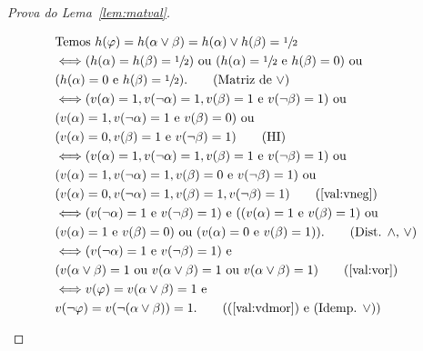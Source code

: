 \begin{proof}[Prova do Lema~\ref{lem:matval}]
\begin{provaporcasos}
\begin{provaporsubcasos}
                    \begin{align*}
                        &\textnormal{Temos }h(\phi) = h(\alpha \lor \beta) = h(\alpha) \lor h(\beta) = \meio{}\\
                        &\Longleftrightarrow (h(\alpha) = h(\beta) = \meio{})\textnormal{ ou } (h(\alpha) = \meio{}\textnormal{ e }h(\beta) = 0)\textnormal{ ou }\\&(h(\alpha) = 0\textnormal{ e }h(\beta) = \meio{}).\tag*{(Matriz de $\lor$)}\\
                        &\Longleftrightarrow (v(\alpha) = 1, v(\neg \alpha) = 1, v(\beta) = 1\textnormal{ e }v(\neg \beta) = 1)\text{ ou }\\&(v(\alpha) = 1, v(\neg \alpha) = 1\textnormal{ e }v(\beta) = 0)\text{ ou }\\&(v(\alpha) = 0, v(\beta) = 1\textnormal{ e }v(\neg \beta) = 1)\tag*{(HI)}\\
                        &\Longleftrightarrow (v(\alpha) = 1, v(\neg \alpha) = 1, v(\beta) = 1\textnormal{ e }v(\neg \beta) = 1)\textnormal{ ou }\\&(v(\alpha) = 1, v(\neg \alpha) = 1, v(\beta) = 0\textnormal{ e }v(\neg \beta) = 1)\textnormal{ ou }\\&(v(\alpha) = 0, v(\neg \alpha) = 1, v(\beta) = 1, v(\neg \beta) = 1)\tag*{(\ref{val:vneg})}\\
                        &\Longleftrightarrow (v(\neg \alpha) = 1\textnormal{ e }v(\neg \beta) = 1)\textnormal{ e }((v(\alpha) = 1\textnormal{ e }v(\beta) = 1)\text{ ou }\\&(v(\alpha) = 1\textnormal{ e }v(\beta) = 0)\text{ ou }(v(\alpha) = 0\textnormal{ e }v(\beta) = 1)).\tag*{(Dist. $\land$, $\lor$)}\\
                        &\Longleftrightarrow (v(\neg \alpha) = 1\textnormal{ e }v(\neg \beta) = 1)\textnormal{ e }\\&(v(\alpha \lor \beta) = 1\textnormal{ ou }v(\alpha \lor \beta) = 1\textnormal{ ou }v(\alpha \lor \beta) = 1)\tag*{(\ref{val:vor})}\\
                        &\Longleftrightarrow v(\phi) = v(\alpha \lor \beta) = 1\textnormal{ e }\\&v(\neg \phi) = v(\neg(\alpha \lor \beta)) = 1.\tag*{((\ref{val:vdmor}) e (Idemp. $\lor$))}
                    \end{align*}
                        

\end{provaporsubcasos}
\end{provaporcasos}
\end{proof}
